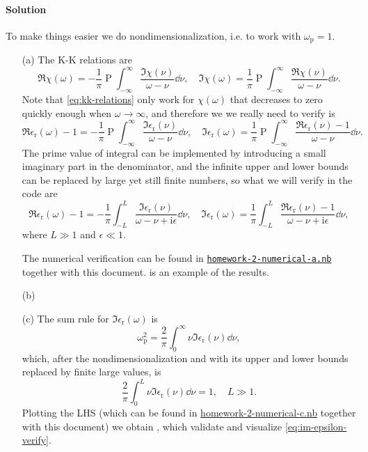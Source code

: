 \documentclass[hyperref, a4paper]{article}
\DeclareMathOperator{\primevalue}{P}
\newcommand*{\ii}{\mathrm{i}}
\begin{document}
\paragraph{Solution} To make things easier we do nondimensionalization, i.e. to work with $\omega_\text{p} = 1$.
\begin{itemize}
    \item[(a)] The K-K relations are
    \begin{equation}
        \Re \chi(\omega) = - \frac{1}{\pi} \primevalue \int_{-\infty}^\infty \frac{\Im \chi(\nu)}{\omega - \nu} \dd{\nu}, \quad \Im \chi(\omega) = \frac{1}{\pi} \primevalue \int_{-\infty}^\infty \frac{\Re \chi(\nu)}{\omega - \nu} \dd{\nu}.
        \label{eq:kk-relations}
    \end{equation}
    Note that \eqref{eq:kk-relations} only work for $\chi(\omega)$ that decreases to zero quickly enough when $\omega \to \infty$, and therefore we we really need to verify is 
    \[
        \Re \epsilon_\text{r}(\omega) - 1 = - \frac{1}{\pi} \primevalue \int_{-\infty}^\infty \frac{\Im \epsilon_\text{r}(\nu)}{\omega - \nu} \dd{\nu}, \quad \Im \epsilon_\text{r}(\omega) = \frac{1}{\pi} \primevalue \int_{-\infty}^\infty \frac{\Re \epsilon_\text{r}(\nu) - 1}{\omega - \nu} \dd{\nu}.
    \]
    The prime value of integral can be implemented by introducing a small imaginary part in the denominator, and the infinite upper and lower bounds can be replaced by large yet still finite numbers, so what we will verify in the code are
    \begin{equation}
        \Re \epsilon_\text{r}(\omega) - 1 = - \frac{1}{\pi} \int_{-L}^L \frac{\Im \epsilon_\text{r}(\nu)}{\omega - \nu + \ii \epsilon} \dd{\nu}, \quad \Im \epsilon_\text{r}(\omega) = \frac{1}{\pi} \int_{-L}^L \frac{\Re \epsilon_\text{r}(\nu) - 1}{\omega - \nu + \ii \epsilon} \dd{\nu},
        \label{eq:kk-program}
    \end{equation}
    where $L \gg 1$ and $\epsilon \ll 1$.

    The numerical verification can be found in \href{./homework-2-numerical-a.nb}{\texttt{homework-2-numerical-a.nb}} together with this document.
     is an example of the results.
    \item[(b)] 
    \item[(c)] The sum rule for $\Im \epsilon_\text{r}(\omega)$ is 
    \begin{equation}
        \omega_\text{p}^2 = \frac{2}{\pi} \int_0^\infty \nu \Im \epsilon_\text{r}(\nu) \dd{\nu},
    \end{equation} 
    which, after the nondimensionalization and with its upper and lower bounds replaced by finite large values, is 
    \begin{equation}
        \frac{2}{\pi} \int_0^L \nu \Im \epsilon_\text{r}(\nu) \dd{\nu} = 1, \quad L \gg 1.
        \label{eq:im-epsilon-verify}
    \end{equation}
    Plotting the LHS (which can be found in \href{homework-2-numerical-c.nb}{homework-2-numerical-c.nb} together with this document) we obtain , which validate and visualize \eqref{eq:im-epsilon-verify}.


\end{itemize}
\end{document}

